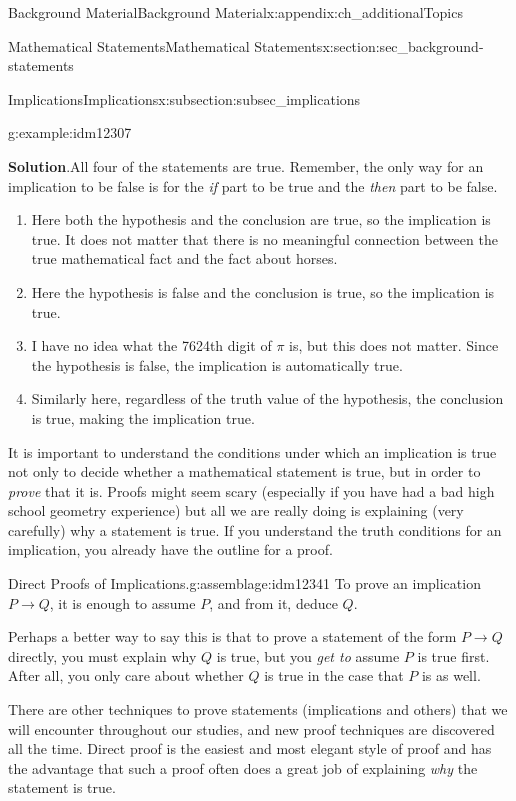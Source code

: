 \documentclass[oneside,10pt,]{book}
\numberwithin{equation}{chapter}
\def\imp{\rightarrow}
\begin{document}
\begin{appendixptx}{Background Material}{}{Background Material}{}{}{x:appendix:ch_additionalTopics}
\begin{sectionptx}{Mathematical Statements}{}{Mathematical Statements}{}{}{x:section:sec_background-statements}
\begin{subsectionptx}{Implications}{}{Implications}{}{}{x:subsection:subsec_implications}
\begin{example}{}{g:example:idm12307}
\begin{enumerate}
\end{enumerate}
%
\par\smallskip%
\noindent\textbf{Solution}.\hypertarget{g:solution:idm12325}{}\quad{}All four of the statements are true. Remember, the only way for an implication to be false is for the \emph{if} part to be true and the \emph{then} part to be false.%
\begin{enumerate}
\item{}Here both the hypothesis and the conclusion are true, so the implication is true. It does not matter that there is no meaningful connection between the true mathematical fact and the fact about horses.%
\item{}Here the hypothesis is false and the conclusion is true, so the implication is true.%
\item{}I have no idea what the 7624th digit of \(\pi\) is, but this does not matter. Since the hypothesis is false, the implication is automatically true.%
\item{}Similarly here, regardless of the truth value of the hypothesis, the conclusion is true, making the implication true.%
\end{enumerate}
%
\end{example}
It is important to understand the conditions under which an implication is true not only to decide whether a mathematical statement is true, but in order to \emph{prove} that it is. Proofs might seem scary (especially if you have had a bad high school geometry experience) but all we are really doing is explaining (very carefully) why a statement is true. If you understand the truth conditions for an implication, you already have the outline for a proof.%
\begin{assemblage}{Direct Proofs of Implications.}{g:assemblage:idm12341}%
To prove an implication \(P \imp Q\), it is enough to assume \(P\), and from it, deduce \(Q\).%
\end{assemblage}
Perhaps a better way to say this is that to prove a statement of the form \(P \imp Q\) directly, you must explain why \(Q\) is true, but you \emph{get to} assume \(P\) is true first.  After all, you only care about whether \(Q\) is true in the case that \(P\) is as well.%
\par
There are other techniques to prove statements (implications and others) that we will encounter throughout our studies, and new proof techniques are discovered all the time. Direct proof is the easiest and most elegant style of proof and has the advantage that such a proof often does a great job of explaining \emph{why} the statement is true.%

\end{subsectionptx}
\end{sectionptx}
\end{appendixptx}
\end{document}
